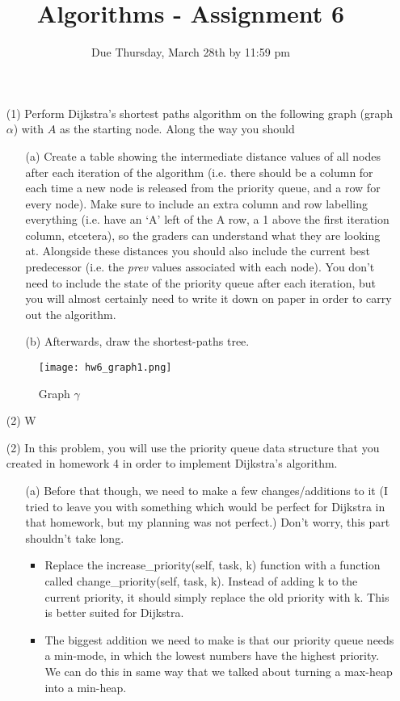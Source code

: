 \documentclass[12pt]{article}
\title{Algorithms - Assignment 6}
\date{Due Thursday, March 28th by 11:59 pm}
\begin{document}
\maketitle

\begin{enumerate}
    \item[(1)] Perform Dijkstra's shortest paths algorithm on the following graph (graph $\alpha$) with $A$ as the starting node. Along the way you should
    \begin{itemize}
        \item[(a)] Create a table showing the intermediate distance values of all nodes after each iteration of the algorithm (i.e. there should be a column for each time a new node is released from the priority queue, and a row for every node). Make sure to include an extra column and row labelling everything (i.e. have an `A' left of the A row, a 1 above the first iteration column, etcetera), so the graders can understand what they are looking at. Alongside these distances you should also include the current best predecessor (i.e. the \emph{prev} values associated with each node). You don't need to include the state of the priority queue after each iteration, but you will almost certainly need to write it down on paper in order to carry out the algorithm.
        \item[(b)] Afterwards, draw the shortest-paths tree. 
    \end{itemize}
    \begin{figure}[h]
        \centering
        \texttt{[image: hw6\_graph1.png]}
        \caption{Graph $\gamma$}
    \end{figure}
    \item[(2)] W
    \item[(2)] In this problem, you will use the priority queue data structure that you created in homework 4 in order to implement Dijkstra's algorithm. 
    \begin{itemize}
        \item[(a)] Before that though, we need to make a few changes/additions to it (I tried to leave you with something which would be perfect for Dijkstra in that homework, but my planning was not perfect.) Don't worry, this part shouldn't take long.
        \begin{itemize}
            \item Replace the increase\_priority(self, task, k) function with a function called change\_priority(self, task, k). Instead of adding k to the current priority, it should simply replace the old priority with k. This is better suited for Dijkstra. 
            \item The biggest addition we need to make is that our priority queue needs a min-mode, in which the lowest numbers have the highest priority. We can do this in same way that we talked about turning a max-heap into a min-heap. 
            

\end{itemize}
\end{itemize}
\end{enumerate}
\end{document}
